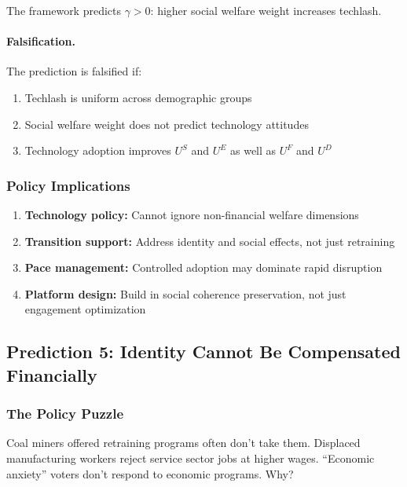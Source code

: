 The framework predicts $\gamma > 0$: higher social welfare weight increases techlash.

\paragraph{Falsification.}
The prediction is falsified if:
\begin{enumerate}
  \item Techlash is uniform across demographic groups
  \item Social welfare weight does not predict technology attitudes
  \item Technology adoption improves $U^S$ and $U^E$ as well as $U^F$ and $U^D$
\end{enumerate}

\subsubsection{Policy Implications}

\begin{enumerate}
  \item \textbf{Technology policy:} Cannot ignore non-financial welfare dimensions
  \item \textbf{Transition support:} Address identity and social effects, not just retraining
  \item \textbf{Pace management:} Controlled adoption may dominate rapid disruption
  \item \textbf{Platform design:} Build in social coherence preservation, not just engagement optimization
\end{enumerate}

\subsection{Prediction 5: Identity Cannot Be Compensated Financially}
\label{subsec:pred-identity}

\subsubsection{The Policy Puzzle}

Coal miners offered retraining programs often don't take them. Displaced 
manufacturing workers reject service sector jobs at higher wages. 
``Economic anxiety'' voters don't respond to economic programs. Why?

